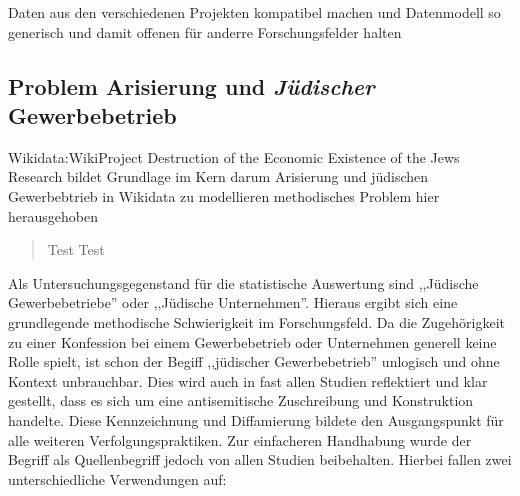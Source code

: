 Daten aus den verschiedenen Projekten kompatibel machen und Datenmodell so generisch und damit offenen für anderre Forschungsfelder halten
\subsection{Problem Arisierung und \textit{Jüdischer} Gewerbebetrieb}

Wikidata:WikiProject Destruction of the Economic Existence of the Jews Research bildet Grundlage
im Kern darum Arisierung und jüdischen Gewerbebtrieb in Wikidata zu modellieren
methodisches Problem hier herausgehoben

\begin{quotation}
    Test Test
    
\end{quotation}



Als Untersuchungsgegenstand für die statistische Auswertung sind ,,Jüdische Gewerbebetriebe'' oder ,,Jüdische Unternehmen''. Hieraus ergibt sich eine grundlegende methodische Schwierigkeit im Forschungsfeld. Da die Zugehörigkeit zu einer Konfession bei einem Gewerbebetrieb oder Unternehmen generell keine Rolle spielt, ist schon der Begiff ,,jüdischer Gewerbebetrieb'' unlogisch und ohne Kontext unbrauchbar. Dies wird auch in fast allen Studien reflektiert und klar gestellt, dass es sich um eine antisemitische Zuschreibung und Konstruktion handelte. Diese Kennzeichnung und Diffamierung bildete den Ausgangspunkt für alle weiteren Verfolgungspraktiken. Zur einfacheren Handhabung wurde der Begriff als Quellenbegriff jedoch von allen Studien beibehalten. Hierbei fallen zwei unterschiedliche Verwendungen auf: 

